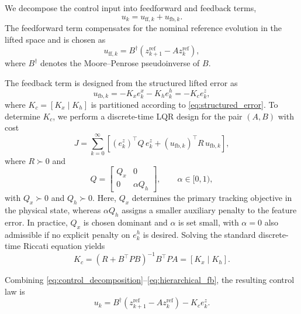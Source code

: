 \documentclass[journal]{IEEEtran}
\begin{document}
We decompose the control input into feedforward and feedback terms,
\begin{equation}
    u_k = u_{\mathrm{ff},k} + u_{\mathrm{fb},k}.
    \label{eq:control_decomposition}
\end{equation}
The feedforward term compensates for the nominal reference evolution in the lifted space and is chosen as
\begin{equation}
    u_{\mathrm{ff},k}
    =
    B^\dagger \!\left(z_{k+1}^{\mathrm{ref}} - A z_k^{\mathrm{ref}}\right),
    \label{eq:feedforward}
\end{equation}
where $B^\dagger$ denotes the Moore--Penrose pseudoinverse of $B$.

The feedback term is designed from the structured lifted error as
\begin{equation}
    u_{\mathrm{fb},k}
    =
    -K_x e_k^x - K_h e_k^h
    =
    -K_c e_k^z,
    \label{eq:hierarchical_fb}
\end{equation}
where $K_c = [K_x\;|\;K_h]$ is partitioned according to \eqref{eq:structured_error}. To determine $K_c$, we perform a discrete-time LQR design for the pair $(A,B)$ with cost
\begin{equation}
    J = \sum_{k=0}^{\infty}
    \left[
        (e_k^z)^\top Q\,e_k^z
        +
        (u_{\mathrm{fb},k})^\top R\,u_{\mathrm{fb},k}
    \right],
    \label{eq:lqr_objective}
\end{equation}
where $R \succ 0$ and
\begin{equation}
    Q =
    \begin{bmatrix}
        Q_x & 0 \\
        0 & \alpha Q_h
    \end{bmatrix},
    \qquad \alpha \in [0,1),
    \label{eq:block_diag_Q}
\end{equation}
with $Q_x \succ 0$ and $Q_h \succ 0$. Here, $Q_x$ determines the primary tracking objective in the physical state, whereas $\alpha Q_h$ assigns a smaller auxiliary penalty to the feature error. In practice, $Q_x$ is chosen dominant and $\alpha$ is set small, with $\alpha = 0$ also admissible if no explicit penalty on $e_k^h$ is desired. Solving the standard discrete-time Riccati equation yields
\begin{equation}
    K_c
    =
    (R + B^\top P B)^{-1} B^\top P A
    =
    [K_x\;|\;K_h].
    \label{eq:lqr_gain}
\end{equation}

Combining \eqref{eq:control_decomposition}--\eqref{eq:hierarchical_fb}, the resulting control law is
\begin{equation}
    u_k
    =
    B^\dagger \!\left(z_{k+1}^{\mathrm{ref}} - A z_k^{\mathrm{ref}}\right)
    - K_c e_k^z.
    \label{eq:full_ctrl}
\end{equation}
\end{document}
